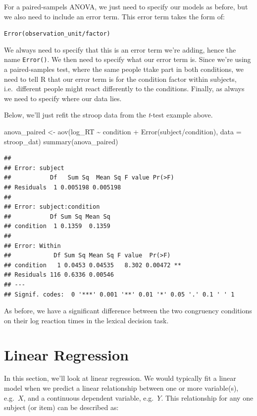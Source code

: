 \documentclass[
]{book}
\newenvironment{Shaded}{\begin{snugshade}}{\end{snugshade}}
\newcommand{\AttributeTok}[1]{\textcolor[rgb]{0.77,0.63,0.00}{#1}}
\newcommand{\FunctionTok}[1]{\textcolor[rgb]{0.00,0.00,0.00}{#1}}
\newcommand{\NormalTok}[1]{#1}
\newcommand{\OtherTok}[1]{\textcolor[rgb]{0.56,0.35,0.01}{#1}}
\newcommand{\SpecialCharTok}[1]{\textcolor[rgb]{0.00,0.00,0.00}{#1}}
\begin{document}
For a paired-sampels ANOVA, we just need to specify our models as before, but we also need to include an error term. This error term takes the form of:

\texttt{Error(observation\_unit/factor)}

We always need to specify that this is an error term we're adding, hence the name \texttt{Error()}. We then need to specify what our error term is. Since we're using a paired-samples test, where the same people ttake part in both conditions, we need to tell R that our error term is for the condition factor within subjects, i.e.~different people might react differently to the conditions. Finally, as always we need to specify where our data lies.

Below, we'll just refit the stroop data from the \emph{t}-test example above.

\begin{Shaded}
\begin{Highlighting}[]
\NormalTok{anova\_paired }\OtherTok{\textless{}{-}} \FunctionTok{aov}\NormalTok{(log\_RT }\SpecialCharTok{\textasciitilde{}}\NormalTok{ condition }\SpecialCharTok{+} \FunctionTok{Error}\NormalTok{(subject}\SpecialCharTok{/}\NormalTok{condition), }\AttributeTok{data =}\NormalTok{ stroop\_dat)}
\FunctionTok{summary}\NormalTok{(anova\_paired)}
\end{Highlighting}
\end{Shaded}

\begin{verbatim}
## 
## Error: subject
##           Df   Sum Sq  Mean Sq F value Pr(>F)
## Residuals  1 0.005198 0.005198               
## 
## Error: subject:condition
##           Df Sum Sq Mean Sq
## condition  1 0.1359  0.1359
## 
## Error: Within
##            Df Sum Sq Mean Sq F value  Pr(>F)   
## condition   1 0.0453 0.04535   8.302 0.00472 **
## Residuals 116 0.6336 0.00546                   
## ---
## Signif. codes:  0 '***' 0.001 '**' 0.01 '*' 0.05 '.' 0.1 ' ' 1
\end{verbatim}

As before, we have a significant difference between the two congruency conditions on their log reaction times in the lexical decision task.

\hypertarget{linear-regression}{%
\section{Linear Regression}\label{linear-regression}}

In this section, we'll look at linear regression. We would typically fit a linear model when we predict a linear relationship between one or more variable(s), e.g.~\(X\), and a continuous dependent variable, e.g.~\(Y\). This relationship for any one subject (or item) can be described as:
\end{document}

